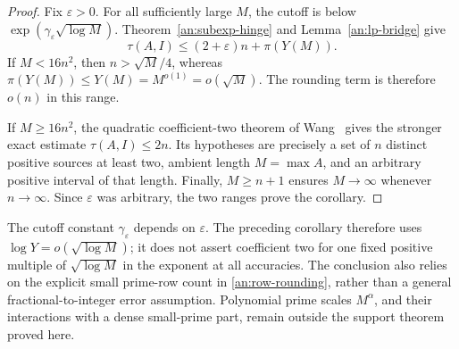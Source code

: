 \begin{proof}
Fix \(\varepsilon>0\). For all sufficiently large \(M\), the cutoff
is below \(\exp(\gamma_\varepsilon\sqrt{\log M})\).
Theorem~\ref{an:subexp-hinge} and Lemma~\ref{an:lp-bridge} give
\[
 \tau(A,I)\le(2+\varepsilon)n+\pi(Y(M)).
\]
If \(M<16n^2\), then \(n>\sqrt M/4\), whereas
\(\pi(Y(M))\le Y(M)=M^{o(1)}=o(\sqrt M)\). The rounding term is
therefore \(o(n)\) in this range.

If \(M\ge16n^2\), the quadratic coefficient-two theorem of
Wang~\cite{Wang} gives the stronger exact estimate
\(\tau(A,I)\le2n\). Its hypotheses are precisely a set of \(n\)
distinct positive sources at least two, ambient length \(M=\max A\),
and an arbitrary positive interval of that length. Finally,
\(M\ge n+1\) ensures \(M\to\infty\) whenever \(n\to\infty\).
Since \(\varepsilon\) was arbitrary, the two ranges prove the
corollary.
\end{proof}

The cutoff constant \(\gamma_\varepsilon\) depends on
\(\varepsilon\). The preceding corollary therefore uses
\(\log Y=o(\sqrt{\log M})\); it does not assert coefficient two for
one fixed positive multiple of \(\sqrt{\log M}\) in the exponent at
all accuracies. The conclusion also relies on the explicit small
prime-row count in \eqref{an:row-rounding}, rather than a general
fractional-to-integer error assumption. Polynomial prime scales
\(M^\alpha\), and their interactions with a dense small-prime part,
remain outside the support theorem proved here.
